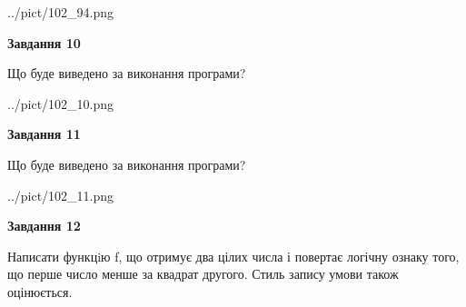 \documentclass[12pt, ukrainian]{article}
\begin{document}
{\begin {large}
\begin{center}
	{../pict/102_94.png}
\end{center}
\newpage

{\begin {center}\textbf{Завдання 10}\end {center}}

Що буде виведено за виконання програми?\par
\begin{center}
	{../pict/102_10.png}
\end{center}
\newpage

{\begin {center}\textbf{Завдання 11}\end {center}}

Що буде виведено за виконання програми?\par
\begin{center}
	{../pict/102_11.png}
\end{center}
\newpage

{\begin {center}\textbf{Завдання 12}\end {center}}


Написати функцiю f, що отримує два цілих числа і повертає логічну ознаку того, що перше число менше за квадрат другого. Стиль запису умови також оцінюється.\par
\newpage

\end {large}}
\end{document}
